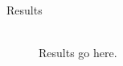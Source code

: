 \documentclass[12pt]{article}
\begin{document}
\begin{description}
	\item[Results] \hfill \\
		Results go here.
		

\end{description}
\end{document}
